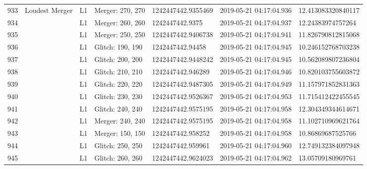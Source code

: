 \begin{longtable}{lllllll}
933  &                                     Loudest Merger &       L1 &  Merger: 270, 270 &  1242447442.9355469 &  2019-05-21 04:17:04.936 &  12.413083320840117 \\
934  &                                                    &       L1 &  Merger: 260, 260 &     1242447442.9375 &  2019-05-21 04:17:04.937 &   12.24383974757264 \\
935  &                                                    &       L1 &  Merger: 250, 250 &  1242447442.9406738 &  2019-05-21 04:17:04.941 &  11.826790812815068 \\
936  &                                                    &       L1 &  Glitch: 190, 190 &    1242447442.94458 &  2019-05-21 04:17:04.945 &  10.246152768703238 \\
937  &                                                    &       L1 &  Glitch: 200, 200 &  1242447442.9448242 &  2019-05-21 04:17:04.945 &  10.562089807236804 \\
938  &                                                    &       L1 &  Glitch: 210, 210 &   1242447442.946289 &  2019-05-21 04:17:04.946 &  10.820103755603872 \\
939  &                                                    &       L1 &  Glitch: 220, 220 &  1242447442.9487305 &  2019-05-21 04:17:04.949 &  11.157971852831363 \\
940  &                                                    &       L1 &  Glitch: 230, 230 &  1242447442.9526367 &  2019-05-21 04:17:04.953 &  11.715412422455545 \\
941  &                                                    &       L1 &  Glitch: 240, 240 &  1242447442.9575195 &  2019-05-21 04:17:04.958 &  12.304349344614671 \\
942  &                                                    &       L1 &  Merger: 240, 240 &  1242447442.9575195 &  2019-05-21 04:17:04.958 &  11.102710969621764 \\
943  &                                                    &       L1 &  Merger: 150, 150 &   1242447442.958252 &  2019-05-21 04:17:04.958 &   10.86869687525766 \\
944  &                                                    &       L1 &  Glitch: 250, 250 &   1242447442.959961 &  2019-05-21 04:17:04.960 &  12.749132384097948 \\
945  &                                                    &       L1 &  Glitch: 260, 260 &  1242447442.9624023 &  2019-05-21 04:17:04.962 &   13.05709180969761 \\

\end{longtable}
